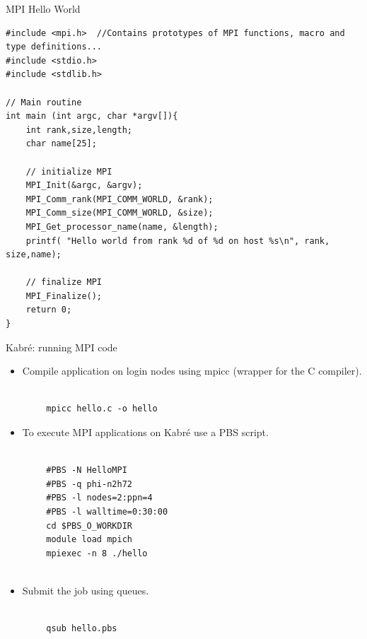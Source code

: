 \begin{frame}[fragile]{MPI Hello World}

\scriptsize\begin{verbatim}
#include <mpi.h>  //Contains prototypes of MPI functions, macro and type definitions...
#include <stdio.h>
#include <stdlib.h>

// Main routine
int main (int argc, char *argv[]){
    int rank,size,length;
    char name[25];

    // initialize MPI
    MPI_Init(&argc, &argv);
    MPI_Comm_rank(MPI_COMM_WORLD, &rank);
    MPI_Comm_size(MPI_COMM_WORLD, &size);
    MPI_Get_processor_name(name, &length);
    printf( "Hello world from rank %d of %d on host %s\n", rank, size,name);

    // finalize MPI
    MPI_Finalize();
    return 0;
}

\end{verbatim}
\normalsize
   
 
    
\end{frame}

\begin{frame}[fragile]{Kabré: running MPI code}

\begin{itemize}
\item Compile application on login nodes using mpicc (wrapper for the C compiler).
\end{itemize}

\small\begin{verbatim}

        mpicc hello.c -o hello
\end{verbatim}
\normalsize

\begin{itemize}
\item To execute MPI applications on Kabré use a PBS script.
\end{itemize}
\small\begin{verbatim}

        #PBS -N HelloMPI
        #PBS -q phi-n2h72
        #PBS -l nodes=2:ppn=4
        #PBS -l walltime=0:30:00
        cd $PBS_O_WORKDIR
        module load mpich
        mpiexec -n 8 ./hello
        
\end{verbatim}
\normalsize
 \vspace{-2mm}
\begin{itemize}
\item Submit the job using queues.
\end{itemize}
 
\small\begin{verbatim}

        qsub hello.pbs
        
\end{verbatim}
\normalsize
\end{frame}

